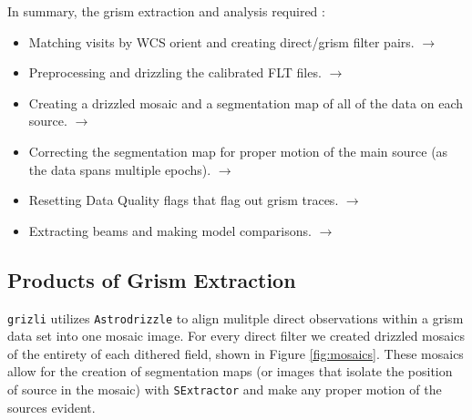 \documentclass[12pt]{article}
\begin{document}
In summary, the grism extraction and analysis required : 
\begin{itemize}
\item Matching visits by WCS orient and creating direct/grism filter pairs.
    \href{http://grizli-calibration.readthedocs.io/en/latest/visit_matching.html#visit-matching-tools}{
        \color{blue}$\rightarrow$}
\item Preprocessing and drizzling the calibrated FLT files. 
    \href{http://grizli-calibration.readthedocs.io/en/latest/visit_matching.html#actually-matching-and-preprocessing-visits}{
        \color{blue}$\rightarrow$}
\item Creating a drizzled mosaic and a segmentation map of all of the data on each source.
    \href{http://grizli-calibration.readthedocs.io/en/latest/drizzling_extracting_etc.html}{
        \color{blue}$\rightarrow$ }
\item Correcting the segmentation map for proper motion of the main source (as the data spans multiple epochs).
    \href{http://grizli-calibration.readthedocs.io/en/latest/drizzling_extracting_etc.html#correcting-seg-map-for-proper-motion}{
        \color{blue}$\rightarrow$ }
\item Resetting Data Quality flags that flag out grism traces.
    \href{http://grizli-calibration.readthedocs.io/en/latest/objects_models_outputs.html#stopping-the-runaway-dq-flag-train}{
        \color{blue}$\rightarrow$ }
\item Extracting beams and making model comparisons. 
    \href{http://grizli-calibration.readthedocs.io/en/latest/objects_models_outputs.html#beams-and-initial-testing}{
        \color{blue}$\rightarrow$ }
\end{itemize}

\subsection{Products of Grism Extraction} 

\texttt{grizli} utilizes \texttt{Astrodrizzle} to align mulitple direct
observations within a grism data set into one mosaic image. For every direct filter we created drizzled mosaics
of the entirety of each dithered field, shown in Figure \ref{fig:mosaics}. These mosaics allow for the creation 
of segmentation maps (or images that isolate the position of source in the
mosaic) with \texttt{SExtractor} and make any proper motion of the sources evident. 
\end{document}
